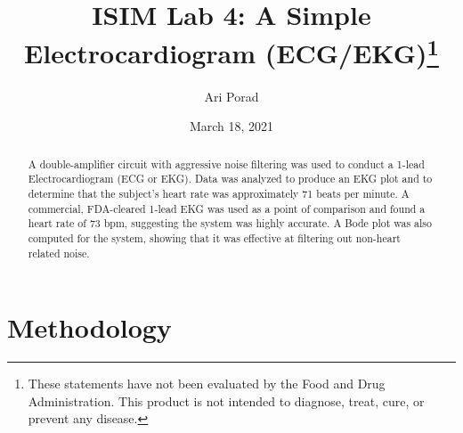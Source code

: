 \documentclass[11pt]{article}
\begin{document}
\title{ISIM Lab 4: A Simple Electrocardiogram (ECG/EKG)\footnote{These statements have not been evaluated by the Food and Drug Administration. This product is not intended to diagnose, treat, cure, or prevent any disease.}}
\author{Ari Porad}
\date{March 18, 2021} %
\maketitle %

\begin{abstract}
    A double-amplifier circuit with aggressive noise filtering was used to conduct a 1-lead Electrocardiogram (ECG or EKG). Data was analyzed to produce an EKG plot and to determine that the subject's heart rate was approximately 71 beats per minute. A commercial, FDA-cleared 1-lead EKG was used as a point of comparison and found a heart rate of 73 bpm, suggesting the system was highly accurate. A Bode plot was also computed for the system, showing that it was effective at filtering out non-heart related noise.
\end{abstract}

\section{Methodology}
\end{document}
